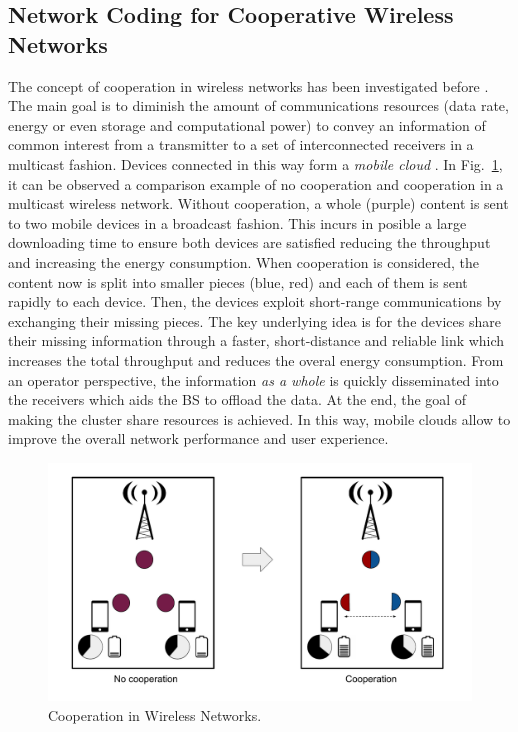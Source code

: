 \subsection{Network Coding for Cooperative Wireless Networks}
The concept of cooperation in wireless networks has been investigated before \cite{fitzek2006cooperation,fitzek2007cognitive,heide2012green,fitzek2013implementation,fitzek2013mobile}. The main goal is to diminish the amount of communications resources (data rate, energy or even storage and computational power) to convey an information of common interest from a transmitter to a set of interconnected receivers in a multicast fashion. Devices connected in this way form a \textit{mobile cloud} \cite{fitzek2013mobile}. In Fig.~\ref{fig:cooperation}, it can be observed a comparison example of no cooperation and cooperation in a multicast wireless network. Without cooperation, a whole (purple) content is sent to two mobile devices in a broadcast fashion. This incurs in posible a large downloading time to ensure both devices are satisfied reducing the throughput and increasing the energy consumption.  When cooperation is considered, the content now is split into smaller pieces (blue, red) and each of them is sent rapidly to each device. Then, the devices exploit short-range communications by exchanging their missing pieces. The key underlying idea is for the devices share their missing information through a faster, short-distance and reliable link which increases the total throughput and reduces the overal energy consumption. From an operator perspective, the information \textit{as a whole} is quickly disseminated into the receivers which aids the \ac{BS} to offload the data. At the end, the goal of making the cluster share resources is achieved. In this way, mobile clouds allow to improve the overall network performance and user experience.

\begin{figure}
  \centering 
  \includegraphics[width=\textwidth]{introduction/figures/cooperation.pdf}
  \caption{Cooperation in Wireless Networks.}
\label{fig:cooperation}
\end{figure} 

